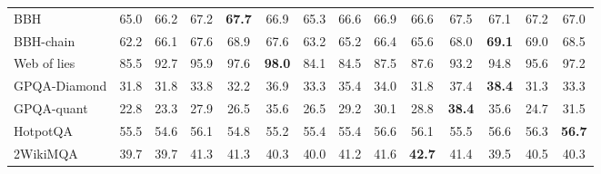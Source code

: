 \begin{table}[t]
\begin{center}
{\begin{tabular}{lccccccccccccc}
BBH          & 65.0 & \cellcolor{green!9}66.2 & \cellcolor{green!12}67.2 & \cellcolor{green!14}\textbf{67.7} & \cellcolor{green!11}66.9 & \cellcolor{green!6}65.3 & \cellcolor{green!10}66.6 & \cellcolor{green!11}66.9 & \cellcolor{green!10}66.6 & \cellcolor{green!14}67.5 & \cellcolor{green!12}67.1 & \cellcolor{green!13}67.2 & \cellcolor{green!12}67.0 \\
BBH-chain    & 62.2 & \cellcolor{green!17}66.1 & \cellcolor{green!22}67.6 & \cellcolor{green!26}68.9 & \cellcolor{green!22}67.6 & \cellcolor{green!9}63.2 & \cellcolor{green!15}65.2 & \cellcolor{green!18}66.4 & \cellcolor{green!16}65.6 & \cellcolor{green!23}68.0 & \cellcolor{green!27}\textbf{69.1} & \cellcolor{green!26}69.0 & \cellcolor{green!25}68.5 \\
Web of lies  & 85.5 & \cellcolor{green!27}92.7 & \cellcolor{green!30}95.9 & \cellcolor{green!30}97.6 & \cellcolor{green!30}\textbf{98.0} & \cellcolor{red!10}84.1 & \cellcolor{red!9}84.5 & \cellcolor{green!12}87.5 & \cellcolor{green!12}87.6 & \cellcolor{green!29}93.2 & \cellcolor{green!30}94.8 & \cellcolor{green!30}95.6 & \cellcolor{green!30}97.2 \\
GPQA-Diamond & 31.8 & 31.8 & \cellcolor{green!11}33.8 & \cellcolor{green!7}32.2 & \cellcolor{green!21}36.9 & \cellcolor{green!10}33.3 & \cellcolor{green!16}35.4 & \cellcolor{green!12}34.0 & 31.8 & \cellcolor{green!23}37.4 & \cellcolor{green!26}\textbf{38.4} & \cellcolor{red!7}31.3 & \cellcolor{green!11}33.3 \\
GPQA-quant   & 22.8 & \cellcolor{green!7}23.3 & \cellcolor{green!21}27.9 & \cellcolor{green!17}26.5 & \cellcolor{green!30}35.6 & \cellcolor{green!17}26.5 & \cellcolor{green!25}29.2 & \cellcolor{green!27}30.1 & \cellcolor{green!24}28.8 & \cellcolor{green!30}\textbf{38.4} & \cellcolor{green!30}35.6 & \cellcolor{green!12}24.7 & \cellcolor{green!30}31.5 \\
HotpotQA     & 55.5 & \cellcolor{red!8}54.6 & \cellcolor{green!7}56.1 & \cellcolor{red!8}54.8 & \cellcolor{red!6}55.2 & \cellcolor{red!6}55.4 & \cellcolor{red!6}55.4 & \cellcolor{green!9}56.6 & \cellcolor{green!7}56.1 & 55.5 & \cellcolor{green!9}56.6 & \cellcolor{green!8}56.3 & \cellcolor{green!10}\textbf{56.7} \\
2WikiMQA     & 39.7 & 39.7 & \cellcolor{green!10}41.3 & \cellcolor{green!10}41.3 & \cellcolor{green!7}40.3 & \cellcolor{green!6}40.0 & \cellcolor{green!10}41.2 & \cellcolor{green!11}41.6 & \cellcolor{green!15}\textbf{42.7} & \cellcolor{green!11}41.4 & \cellcolor{red!7}39.5 & \cellcolor{green!8}40.5 & \cellcolor{green!8}40.3 \\

\end{tabular}}
\end{center}
\end{table}
